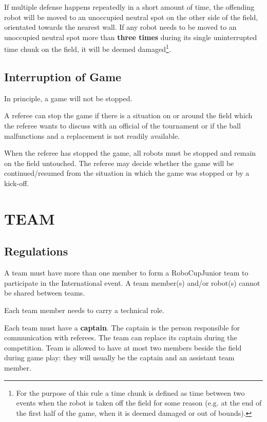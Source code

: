 \documentclass{article}
\begin{document}
If multiple defense happens repeatedly in a short amount of time, the offending
robot will be moved to an unoccupied neutral spot on the other side of the
field, orientated towards the nearest wall.  If any robot needs to be moved to
an unoccupied neutral spot more than \textbf{three times} during its single
uninterrupted time chunk on the field, it will be deemed damaged\footnote{For
    the purpose of this rule a time chunk is defined as time between two events
    when the robot is taken off the field for some reason (e.g. at the end of
the first half of the game, when it is deemed damaged or out of bounds).}.

\subsection{Interruption of Game \label{ref-interruption}}

In principle, a game will not be stopped.

A referee can stop the game if there is a situation on or around the field
which the referee wants to discuss with an official of the tournament or if the
ball malfunctions and a replacement is not readily available.

When the referee has stopped the game, all robots must be stopped and remain on
the field untouched. The referee may decide whether the game will be
continued/resumed from the situation in which the game was stopped or by a
kick-off.

\section{TEAM \label{ref-015}}

\subsection{Regulations \label{ref-team-regulations}}

A team must have more than one member to form a RoboCupJunior team to
participate in the International event. A team member(s) and/or robot(s) cannot
be shared between teams.

Each team member needs to carry a technical role.

Each team must have a \textbf{captain}. The captain is the person responsible
for communication with referees. The team can replace its captain during the
competition. Team is allowed to have at most two members beside the field
during game play: they will usually be the captain and an assistant team
member.
\end{document}
